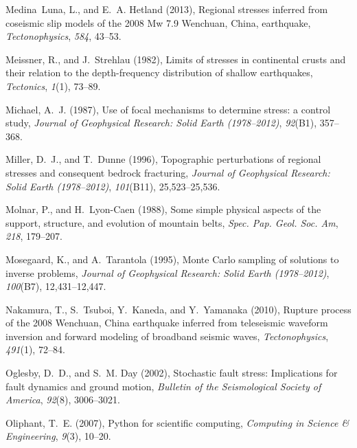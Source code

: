 \documentclass[twocolumn,jgrga]{AGUTeX}
\begin{document}
\begin{article}
{{{\begin{thebibliography}{89}
Medina~Luna, L., and E.~A. Hetland (2013), Regional stresses inferred from
  coseismic slip models of the 2008 {M}w 7.9 {W}enchuan, {C}hina, earthquake,
  \textit{Tectonophysics}, \textit{584}, 43--53.

Meissner, R., and J.~Strehlau (1982), Limits of stresses in continental crusts
  and their relation to the depth-frequency distribution of shallow
  earthquakes, \textit{Tectonics}, \textit{1}(1), 73--89.

Michael, A.~J. (1987), Use of focal mechanisms to determine stress: a control
  study, \textit{Journal of Geophysical Research: Solid Earth (1978--2012)},
  \textit{92}(B1), 357--368.

Miller, D.~J., and T.~Dunne (1996), Topographic perturbations of regional
  stresses and consequent bedrock fracturing, \textit{Journal of Geophysical
  Research: Solid Earth (1978--2012)}, \textit{101}(B11), 25,523--25,536.

Molnar, P., and H.~Lyon-Caen (1988), Some simple physical aspects of the
  support, structure, and evolution of mountain belts, \textit{Spec. Pap. Geol.
  Soc. Am}, \textit{218}, 179--207.

Mosegaard, K., and A.~Tarantola (1995), Monte {C}arlo sampling of solutions to
  inverse problems, \textit{Journal of Geophysical Research: Solid Earth
  (1978--2012)}, \textit{100}(B7), 12,431--12,447.

Nakamura, T., S.~Tsuboi, Y.~Kaneda, and Y.~Yamanaka (2010), Rupture process of
  the 2008 {W}enchuan, {C}hina earthquake inferred from teleseismic waveform
  inversion and forward modeling of broadband seismic waves,
  \textit{Tectonophysics}, \textit{491}(1), 72--84.

Oglesby, D.~D., and S.~M. Day (2002), Stochastic fault stress: {I}mplications
  for fault dynamics and ground motion, \textit{Bulletin of the Seismological
  Society of America}, \textit{92}(8), 3006--3021.

Oliphant, T.~E. (2007), Python for scientific computing, \textit{Computing in
  Science \& Engineering}, \textit{9}(3), 10--20.


\end{thebibliography}}}}
\end{article}
\end{document}
